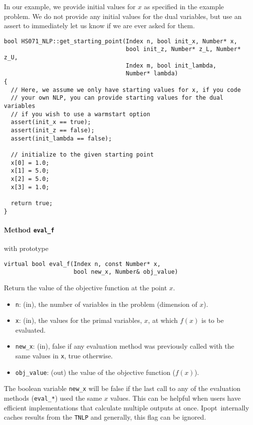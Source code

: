 \documentclass[10pt]{article}
\newcommand{\Ipopt}{{\sc Ipopt}}
\begin{document}
In our example, we provide initial values for $x$ as specified in the
example problem. We do not provide any initial values for the dual
variables, but use an assert to immediately let us know if we are ever
asked for them.

\begin{footnotesize}
\begin{verbatim}
bool HS071_NLP::get_starting_point(Index n, bool init_x, Number* x,
                                   bool init_z, Number* z_L, Number* z_U,
                                   Index m, bool init_lambda,
                                   Number* lambda)
{
  // Here, we assume we only have starting values for x, if you code
  // your own NLP, you can provide starting values for the dual variables
  // if you wish to use a warmstart option
  assert(init_x == true);
  assert(init_z == false);
  assert(init_lambda == false);

  // initialize to the given starting point
  x[0] = 1.0;
  x[1] = 5.0;
  x[2] = 5.0;
  x[3] = 1.0;

  return true;
}
\end{verbatim}
\end{footnotesize}

\paragraph{Method {\texttt{eval\_f}}} with prototype
\begin{verbatim}
virtual bool eval_f(Index n, const Number* x, 
                    bool new_x, Number& obj_value)
\end{verbatim}
Return the value of the objective function at the point $x$.
\begin{itemize}
\item {\tt n}: (in), the number of variables in the problem (dimension
  of $x$).
\item {\tt x}: (in), the values for the primal variables, $x$, at which
  $f(x)$ is to be evaluated.
\item {\tt new\_x}: (in), false if any evaluation method was
  previously called with the same values in {\tt x}, true otherwise.
\item {\tt obj\_value}: (out) the value of the objective function
  ($f(x)$).
\end{itemize}

The boolean variable {\tt new\_x} will be false if the last call to
any of the evaluation methods ({\tt eval\_*}) used the same $x$
values. This can be helpful when users have efficient implementations
that calculate multiple outputs at once. \Ipopt\ internally caches
results from the {\tt TNLP} and generally, this flag can be ignored.
\end{document}
